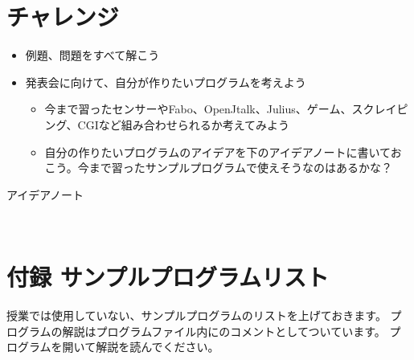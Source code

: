 \clearpage
{}\label{P:challenge}
\section{チャレンジ}
\begin{itemize}
  \item 例題、問題をすべて解こう
  \item 発表会に向けて、自分が作りたいプログラムを考えよう
  \begin{itemize}
    \item 今まで習ったセンサーやFabo、OpenJtalk、Julius、ゲーム、スクレイピング、CGIなど組み合わせられるか考えてみよう
    \item 自分の作りたいプログラムのアイデアを下のアイデアノートに書いておこう。今まで習ったサンプルプログラムで使えそうなのはあるかな？
  \end{itemize}
\end{itemize}
アイデアノート

\begin{center}
\tablefirsthead{}
\tablehead{}
\tabletail{}
\tablelasttail{}
\begin{boxedminipage}{16.806cm}
	　　　　　　　　　　　　　　　　　　　　　　　　　
	\vspace{15cm}
\end{boxedminipage}
\end{center}

\clearpage
\section{付録 サンプルプログラムリスト}
授業では使用していない、サンプルプログラムのリストを上げておきます。
プログラムの解説はプログラムファイル内にのコメントとしてついています。
プログラムを開いて解説を読んでください。

